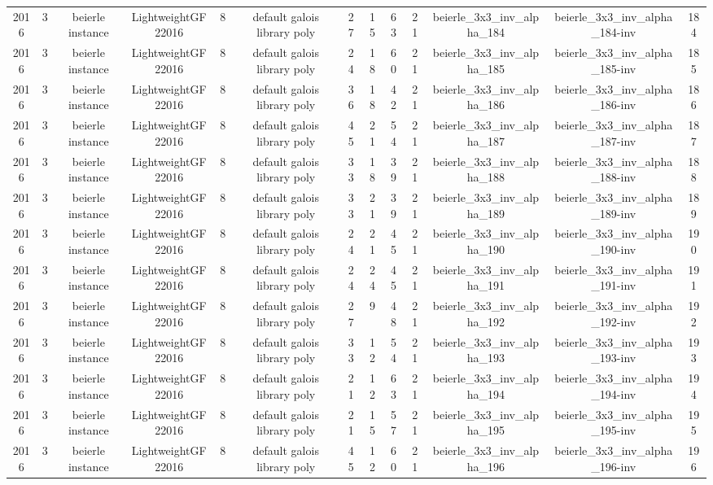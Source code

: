 \begin{tabular}{c c c c c c c c c c c c c}
2016 & 3 & beierle instance & LightweightGF22016 & 8 & default galois library poly & 27 & 15 & 63 & 21 & beierle_3x3_inv_alpha_184 & beierle_3x3_inv_alpha_184-inv & 184 \\
2016 & 3 & beierle instance & LightweightGF22016 & 8 & default galois library poly & 24 & 18 & 60 & 21 & beierle_3x3_inv_alpha_185 & beierle_3x3_inv_alpha_185-inv & 185 \\
2016 & 3 & beierle instance & LightweightGF22016 & 8 & default galois library poly & 36 & 18 & 42 & 21 & beierle_3x3_inv_alpha_186 & beierle_3x3_inv_alpha_186-inv & 186 \\
2016 & 3 & beierle instance & LightweightGF22016 & 8 & default galois library poly & 45 & 21 & 54 & 21 & beierle_3x3_inv_alpha_187 & beierle_3x3_inv_alpha_187-inv & 187 \\
2016 & 3 & beierle instance & LightweightGF22016 & 8 & default galois library poly & 33 & 18 & 39 & 21 & beierle_3x3_inv_alpha_188 & beierle_3x3_inv_alpha_188-inv & 188 \\
2016 & 3 & beierle instance & LightweightGF22016 & 8 & default galois library poly & 33 & 21 & 39 & 21 & beierle_3x3_inv_alpha_189 & beierle_3x3_inv_alpha_189-inv & 189 \\
2016 & 3 & beierle instance & LightweightGF22016 & 8 & default galois library poly & 24 & 21 & 45 & 21 & beierle_3x3_inv_alpha_190 & beierle_3x3_inv_alpha_190-inv & 190 \\
2016 & 3 & beierle instance & LightweightGF22016 & 8 & default galois library poly & 24 & 24 & 45 & 21 & beierle_3x3_inv_alpha_191 & beierle_3x3_inv_alpha_191-inv & 191 \\
2016 & 3 & beierle instance & LightweightGF22016 & 8 & default galois library poly & 27 & 9 & 48 & 21 & beierle_3x3_inv_alpha_192 & beierle_3x3_inv_alpha_192-inv & 192 \\
2016 & 3 & beierle instance & LightweightGF22016 & 8 & default galois library poly & 33 & 12 & 54 & 21 & beierle_3x3_inv_alpha_193 & beierle_3x3_inv_alpha_193-inv & 193 \\
2016 & 3 & beierle instance & LightweightGF22016 & 8 & default galois library poly & 21 & 12 & 63 & 21 & beierle_3x3_inv_alpha_194 & beierle_3x3_inv_alpha_194-inv & 194 \\
2016 & 3 & beierle instance & LightweightGF22016 & 8 & default galois library poly & 21 & 15 & 57 & 21 & beierle_3x3_inv_alpha_195 & beierle_3x3_inv_alpha_195-inv & 195 \\
2016 & 3 & beierle instance & LightweightGF22016 & 8 & default galois library poly & 45 & 12 & 60 & 21 & beierle_3x3_inv_alpha_196 & beierle_3x3_inv_alpha_196-inv & 196 \\

\end{tabular}
